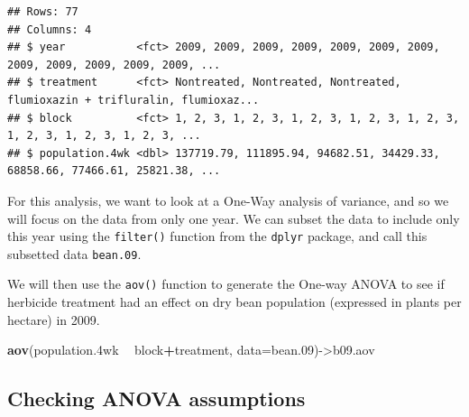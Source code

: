 \documentclass[letterpaper,]{book}
\newenvironment{Shaded}{\begin{snugshade}}{\end{snugshade}}
\newcommand{\DataTypeTok}[1]{\textcolor[rgb]{0.13,0.29,0.53}{#1}}
\newcommand{\DecValTok}[1]{\textcolor[rgb]{0.00,0.00,0.81}{#1}}
\newcommand{\FloatTok}[1]{\textcolor[rgb]{0.00,0.00,0.81}{#1}}
\newcommand{\KeywordTok}[1]{\textcolor[rgb]{0.13,0.29,0.53}{\textbf{#1}}}
\newcommand{\NormalTok}[1]{#1}
\newcommand{\OperatorTok}[1]{\textcolor[rgb]{0.81,0.36,0.00}{\textbf{#1}}}
\newcommand{\StringTok}[1]{\textcolor[rgb]{0.31,0.60,0.02}{#1}}
\begin{document}
\begin{verbatim}
## Rows: 77
## Columns: 4
## $ year           <fct> 2009, 2009, 2009, 2009, 2009, 2009, 2009, 2009, 2009, 2009, 2009, 2009, ...
## $ treatment      <fct> Nontreated, Nontreated, Nontreated, flumioxazin + trifluralin, flumioxaz...
## $ block          <fct> 1, 2, 3, 1, 2, 3, 1, 2, 3, 1, 2, 3, 1, 2, 3, 1, 2, 3, 1, 2, 3, 1, 2, 3, ...
## $ population.4wk <dbl> 137719.79, 111895.94, 94682.51, 34429.33, 68858.66, 77466.61, 25821.38, ...
\end{verbatim}

For this analysis, we want to look at a One-Way analysis of variance, and so we will focus on the data from only one year. We can subset the data to include only this year using the \texttt{filter()} function from the \texttt{dplyr} package, and call this subsetted data \texttt{bean.09}.

\begin{Shaded}
\end{Shaded}

We will then use the \texttt{aov()} function to generate the One-way ANOVA to see if herbicide treatment had an effect on dry bean population (expressed in plants per hectare) in 2009.

\begin{Shaded}
\begin{Highlighting}[]
\KeywordTok{aov}\NormalTok{(population}\FloatTok{.4}\NormalTok{wk }\OperatorTok{~}\StringTok{ }\NormalTok{block}\OperatorTok{+}\NormalTok{treatment, }\DataTypeTok{data=}\NormalTok{bean}\FloatTok{.09}\NormalTok{)->b09.aov}
\end{Highlighting}
\end{Shaded}

\hypertarget{checking-anova-assumptions}{%
\subsection{Checking ANOVA assumptions}\label{checking-anova-assumptions}}
\end{document}
